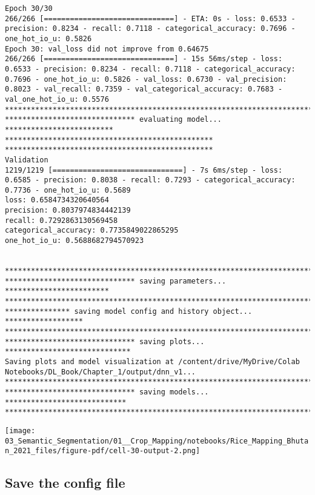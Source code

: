\documentclass[
  letterpaper,
  DIV=11,
  numbers=noendperiod]{scrreprt}
\begin{document}
\begin{verbatim}
Epoch 30/30
266/266 [==============================] - ETA: 0s - loss: 0.6533 - precision: 0.8234 - recall: 0.7118 - categorical_accuracy: 0.7696 - one_hot_io_u: 0.5826
Epoch 30: val_loss did not improve from 0.64675
266/266 [==============================] - 15s 56ms/step - loss: 0.6533 - precision: 0.8234 - recall: 0.7118 - categorical_accuracy: 0.7696 - one_hot_io_u: 0.5826 - val_loss: 0.6730 - val_precision: 0.8023 - val_recall: 0.7359 - val_categorical_accuracy: 0.7683 - val_one_hot_io_u: 0.5576
****************************************************************************
****************************** evaluating model... *************************
************************************************
************************************************
Validation
1219/1219 [==============================] - 7s 6ms/step - loss: 0.6585 - precision: 0.8038 - recall: 0.7293 - categorical_accuracy: 0.7736 - one_hot_io_u: 0.5689
loss: 0.6584734320640564
precision: 0.8037974834442139
recall: 0.7292863130569458
categorical_accuracy: 0.7735849022865295
one_hot_io_u: 0.5688682794570923


****************************************************************************
****************************** saving parameters... ************************
****************************************************************************
*************** saving model config and history object... ******************
****************************************************************************
****************************** saving plots... *****************************
Saving plots and model visualization at /content/drive/MyDrive/Colab Notebooks/DL_Book/Chapter_1/output/dnn_v1...
****************************************************************************
****************************** saving models... ****************************
****************************************************************************
\end{verbatim}

\texttt{[image: 03\_Semantic\_Segmentation/01\_\_Crop\_Mapping/notebooks/Rice\_Mapping\_Bhutan\_2021\_files/figure-pdf/cell-30-output-2.png]}

\subsection{Save the config file}\label{save-the-config-file-1}
\end{document}
